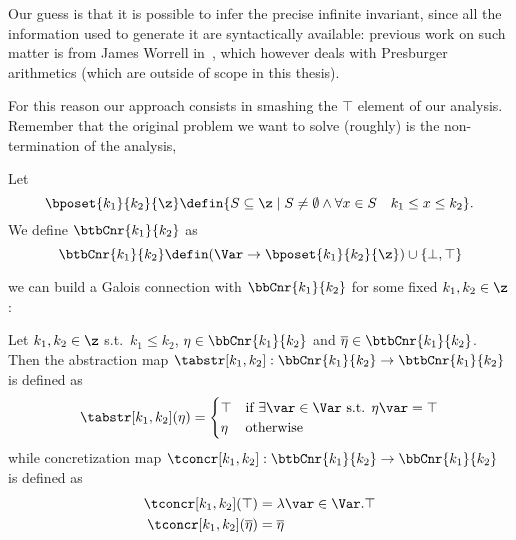Our guess is that it is possible to infer the precise infinite
invariant, since all the information used to generate it are
syntactically available: previous work on such matter is from James
Worrell in~\cite{Lefaucheux2024}, which however deals with Presburger
arithmetics (which are outside of scope in this thesis).

For this reason our approach consists in smashing the \(\top\) element
of our analysis. Remember that the original problem we want to solve
(roughly) is the non-termination of the analysis,


\begin{definition}
  Let
  \begin{equation*}
    \bposet{k_1}{k_2}{\z} \defin \{S \subseteq \z \mid S \neq \emptyset \land \forall x \in S \quad k_1 \leq x \leq k_2\}.
  \end{equation*}
  We define \(\btbCnr{k_1}{k_2}\) as
  \begin{equation*}
    \btbCnr{k_1}{k_2} \defin (\Var \to \bposet{k_1}{k_2}{\z}) \cup \{\bot, \top\}
  \end{equation*}
\end{definition}

we can build a Galois connection with \(\bbCnr{k_1}{k_2}\) for some
fixed \(k_1, k_2 \in \z\):

\begin{definition}
  Let \(k_1, k_2 \in \z\) s.t.\ \(k_1 \leq k_2\),
  \(\eta \in \bbCnr{k_1}{k_2}\) and
  \(\overline\eta \in \btbCnr{k_1}{k_2}\). Then the abstraction map
  \({\tabstr[k_1,k_2]} : \bbCnr{k_1}{k_2} \to \btbCnr{k_1}{k_2}\) is
  defined as
  \begin{equation*}
    {\tabstr[k_1,k_2]}(\eta) = \begin{cases}
      \top & \text{if } \exists\var\in\Var \text{ s.t. } \eta\var = \top \\
      \eta & \text{otherwise}
    \end{cases}
  \end{equation*}
  while concretization map
  \({\tconcr[k_1,k_2]} : \btbCnr{k_1}{k_2} \to \bbCnr{k_1}{k_2}\)
  is defined as
  \begin{align*}
    \tconcr[k_1,k_2](\top) & = \lambda \var \in \Var . \top \\
    \tconcr[k_1,k_2](\overline\eta) & = \overline\eta
  \end{align*}
\end{definition}

